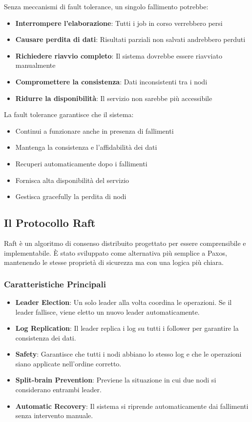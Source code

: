 \documentclass[12pt,a4paper]{article}
\begin{document}
Senza meccanismi di fault tolerance, un singolo fallimento potrebbe:

\begin{itemize}
\item \textbf{Interrompere l'elaborazione}: Tutti i job in corso verrebbero persi
\item \textbf{Causare perdita di dati}: Risultati parziali non salvati andrebbero perduti
\item \textbf{Richiedere riavvio completo}: Il sistema dovrebbe essere riavviato manualmente
\item \textbf{Compromettere la consistenza}: Dati inconsistenti tra i nodi
\item \textbf{Ridurre la disponibilità}: Il servizio non sarebbe più accessibile
\end{itemize}

La fault tolerance garantisce che il sistema:
\begin{itemize}
\item Continui a funzionare anche in presenza di fallimenti
\item Mantenga la consistenza e l'affidabilità dei dati
\item Recuperi automaticamente dopo i fallimenti
\item Fornisca alta disponibilità del servizio
\item Gestisca gracefully la perdita di nodi
\end{itemize}

\subsection{Il Protocollo Raft}

Raft è un algoritmo di consenso distribuito progettato per essere comprensibile e implementabile. È stato sviluppato come alternativa più semplice a Paxos, mantenendo le stesse proprietà di sicurezza ma con una logica più chiara.

\subsubsection{Caratteristiche Principali}

\begin{itemize}
\item \textbf{Leader Election}: Un solo leader alla volta coordina le operazioni. Se il leader fallisce, viene eletto un nuovo leader automaticamente.
\item \textbf{Log Replication}: Il leader replica i log su tutti i follower per garantire la consistenza dei dati.
\item \textbf{Safety}: Garantisce che tutti i nodi abbiano lo stesso log e che le operazioni siano applicate nell'ordine corretto.
\item \textbf{Split-brain Prevention}: Previene la situazione in cui due nodi si considerano entrambi leader.
\item \textbf{Automatic Recovery}: Il sistema si riprende automaticamente dai fallimenti senza intervento manuale.
\end{itemize}
\end{document}
